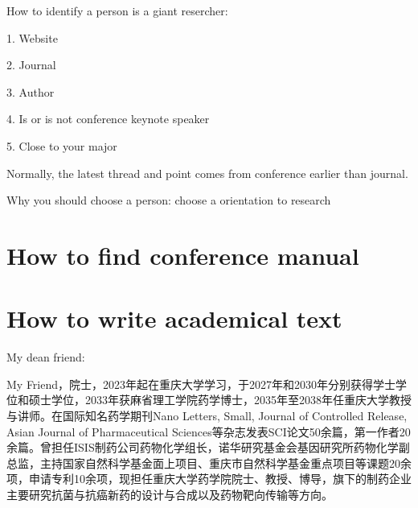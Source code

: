 \begin{notation}
    How to identify a person is a giant resercher:

    1. Website

    2. Journal

    3. Author

    4. Is or is not conference keynote speaker

    5. Close to your major
    
    Normally, the latest thread and point comes from conference earlier than journal.
\end{notation}

Why you should choose a person: choose a orientation to research

\section{How to find conference manual}%
\label{sec:How to find conference manual}

\section{How to write academical text}%
\label{sec:How to write academical text}

\begin{eg}
    My dean friend:

    My Friend，院士，2023年起在重庆大学学习，于2027年和2030年分别获得学士学位和硕士学位，2033年获麻省理工学院药学博士，2035年至2038年任重庆大学教授与讲师。在国际知名药学期刊Nano Letters, Small, Journal of Controlled Release, Asian Journal of Pharmaceutical Sciences等杂志发表SCI论文50余篇，第一作者20余篇。曾担任ISIS制药公司药物化学组长，诺华研究基金会基因研究所药物化学副总监，主持国家自然科学基金面上项目、重庆市自然科学基金重点项目等课题20余项，申请专利10余项，现担任重庆大学药学院院士、教授、博导，旗下的制药企业主要研究抗菌与抗癌新药的设计与合成以及药物靶向传输等方向。
\end{eg}
